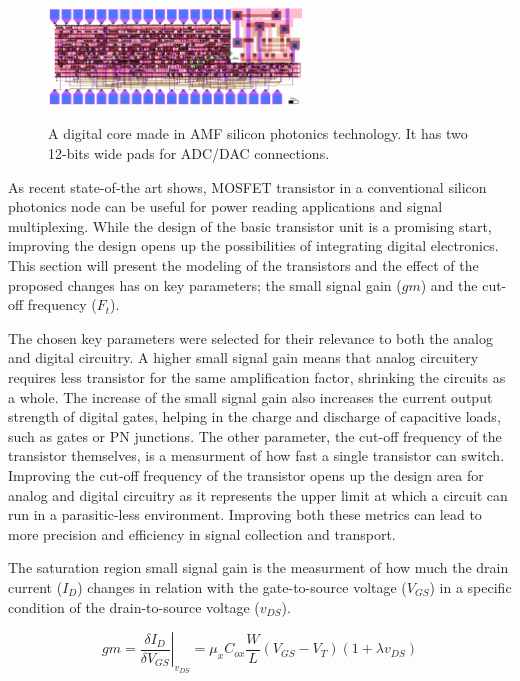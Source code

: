 \begin{figure}[t]
    \centering
    \includegraphics[width=0.6\textwidth]{Core.png}
    \label{fig:Core}
    \caption{A digital core made in AMF silicon photonics technology. It has two 12-bits wide pads for ADC/DAC connections. }
\end{figure}
As recent state-of-the art shows, MOSFET transistor in a conventional silicon photonics node can be useful for power reading applications and signal multiplexing\CitationNeeded. 
While the design of the basic transistor unit is a promising start, improving the design opens up the possibilities of integrating digital electronics.
This section will present the modeling of the transistors and the effect of the proposed changes has on key parameters; the small signal gain ($gm$) and the cut-off frequency ($F_t$).

The chosen key parameters were selected for their relevance to both the analog and digital circuitry. 
A higher small signal gain means that analog circuitery requires less transistor for the same amplification factor, shrinking the circuits as a whole. 
The increase of the small signal gain also increases the current output strength of digital gates, helping in the charge and discharge of capacitive loads, such as gates or PN junctions. 
The other parameter, the cut-off frequency of the transistor themselves, is a measurment of how fast a single transistor can switch.
Improving the cut-off frequency of the transistor opens up the design area for analog and digital circuitry as it represents the upper limit at which a circuit can run in a parasitic-less environment.  
Improving both these metrics can lead to more precision and efficiency in signal collection and transport.

The saturation region small signal gain is the measurment of how much the drain current ($I_D$) changes in relation with the gate-to-source voltage ($V_{GS}$) in a specific condition of the drain-to-source voltage ($v_{DS}$).

\begin{equation}
\label{eq:gm}
gm = \left.\frac{\delta I_D}{\delta V_{GS}}\right|_{v_{DS}} = \mu_x C_{ox}\frac{W}{L}(V_{GS}-V_T)(1+\lambda v_{DS})
\end{equation}

